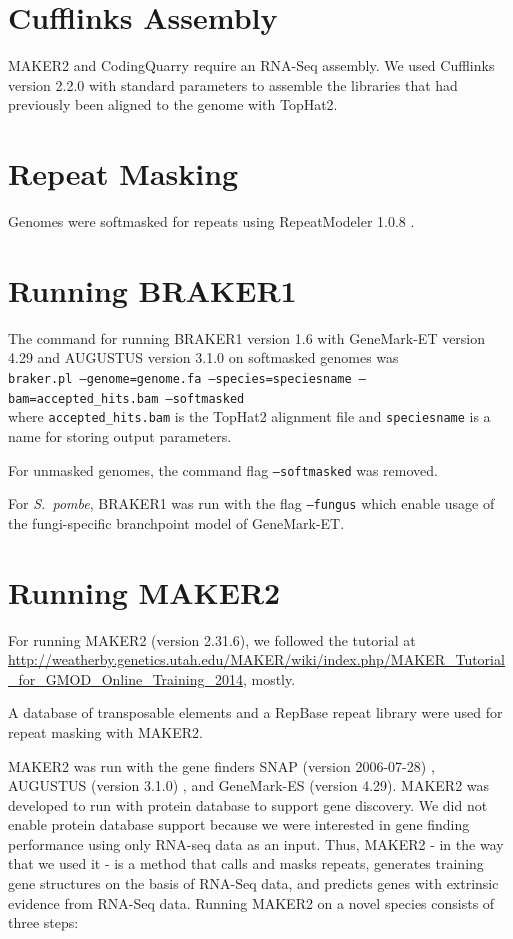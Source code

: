 \documentclass[a4paper,10pt]{report}
\begin{document}
\section{Cufflinks Assembly}

MAKER2 \cite{MAKER2} and CodingQuarry \cite{CodingQuarry} require an RNA-Seq assembly. We used Cufflinks version 2.2.0 with standard parameters to assemble the libraries that had previously been aligned to the genome with TopHat2. 

\section{Repeat Masking}

Genomes were softmasked for repeats using RepeatModeler 1.0.8 \cite{RepeatModeler}.

\section{Running BRAKER1}

The command for running BRAKER1 version 1.6 with GeneMark-ET version 4.29 and AUGUSTUS version 3.1.0 on softmasked genomes was\\

\noindent \texttt{braker.pl --genome=genome.fa --species=speciesname --bam=accepted\_hits.bam --softmasked}\\

\noindent where \texttt{accepted\_hits.bam} is the TopHat2 alignment file and \texttt{speciesname} is a name for storing output parameters.

\noindent For unmasked genomes, the command flag \texttt{--softmasked} was removed.

\noindent For \textit{S.~pombe}, BRAKER1 was run with the flag \texttt{--fungus} which enable usage of the fungi-specific branchpoint model of GeneMark-ET.

\section{Running MAKER2}

For running MAKER2 (version 2.31.6), we followed the tutorial at \url{http://weatherby.genetics.utah.edu/MAKER/wiki/index.php/MAKER_Tutorial_for_GMOD_Online_Training_2014}, mostly.

A database of transposable elements and a RepBase repeat library were used for repeat masking with MAKER2.

MAKER2 was run with the gene finders SNAP (version 2006-07-28) \cite{SNAP}, AUGUSTUS (version 3.1.0) \cite{AUGUSTUS}, and GeneMark-ES \cite{GeneMark-ES} (version 4.29). MAKER2 was developed to run with protein database to support gene discovery. We did not enable protein database support because we were interested in gene finding performance using only RNA-seq data as an input. Thus, MAKER2 - in the way that we used it - is a method that calls and masks repeats, generates training gene structures on the basis of RNA-Seq data, and predicts genes with extrinsic evidence from RNA-Seq data. Running MAKER2 on a novel species consists of three steps: 
\end{document}
